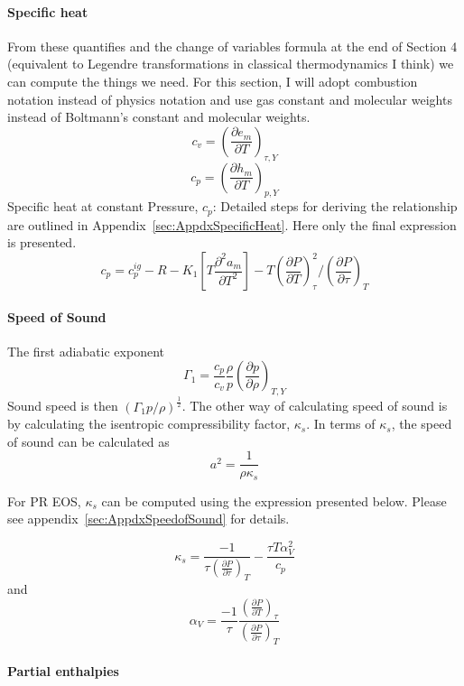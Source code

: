 \documentclass[11pt]{article}
\newcommand{\half}{\frac{1}{2}}
\begin{document}
\paragraph{Specific heat}
From these quantifies and the change of variables formula at the end of Section 4 (equivalent to Legendre
transformations in classical thermodynamics I think) we can compute the things we need.
For this section, I will adopt combustion notation instead of physics notation and use gas constant
and molecular weights instead of Boltmann's constant and molecular weights.  
\[
c_v = \left( \frac{\partial e_m}{\partial T}\right)_{\tau,Y}
\]
\[
c_p = \left( \frac{\partial h_m}{\partial T}\right)_{p,Y}
\]
Specific heat at constant Pressure, $c_p$: Detailed steps for deriving the relationship are outlined in Appendix~\ref{sec:AppdxSpecificHeat}. Here only the final expression is presented. 
\begin{equation}
c_{p} = c_{p}^{ig} -R -K_1 \left[T \frac{\partial^{2} a_{m}}{\partial T^{2}} \right] - T\left(\frac{\partial P}{\partial T}\right)^{2}_{\tau}/ \left(\frac{\partial P}{\partial \tau}\right)_{T}
\label{eq:CpRelation}
\end{equation}

\paragraph{Speed of Sound}

The first adiabatic exponent
\[
\Gamma_1 = \frac{c_p}{c_v} \frac{\rho}{p} 
\left( \frac{\partial p}{\partial \rho}\right)_{T,Y}
\]
Sound speed is then $(\Gamma_1 p / \rho)^\half$. The other way of calculating speed of sound is by calculating the isentropic compressibility factor, $\kappa_s$. In terms of $\kappa_s$, the speed of sound can be calculated as  
     \[    a^{2} = \frac{1}{\rho \kappa_{s}} \label{eq:SpeedofSound}   \]
  
 For PR EOS, $\kappa_s$ can be computed using the expression presented below. Please see appendix~\ref{sec:AppdxSpeedofSound} for details. 
   
\[     \kappa_{s} = \frac{-1}{\tau \left(\frac{\partial P}{\partial \tau} \right)_{T} } - \frac{\tau T \alpha_{V}^{2}}{c_{p}}   \]
    and 
\[ \alpha_{V} = \frac{-1}{\tau} \frac{\left(\frac{\partial P}{\partial T} \right)_{\tau}}{\left(\frac{\partial P}{\partial \tau} \right)_{T} } \]
\paragraph{Partial enthalpies}
    
\end{document}
